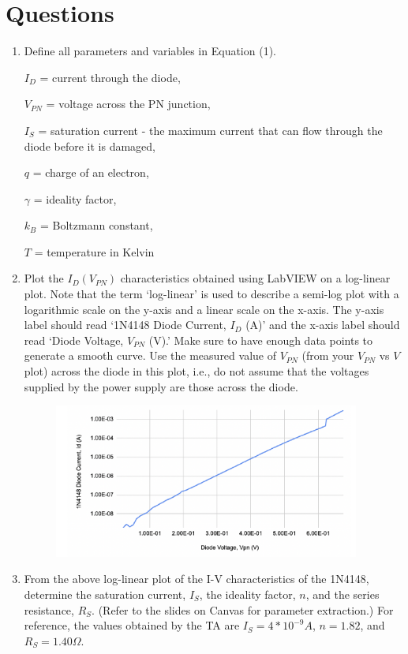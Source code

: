\documentclass[12pt]{article}
\begin{document}
\section{Questions}
\begin{enumerate}
\item Define all parameters and variables in Equation (1).

$I_D$ = current through the diode,

$V_{PN}$ = voltage across the PN junction,

$I_S$ = saturation current - the maximum current that can flow through the diode before it is damaged,

$q$ = charge of an electron,

$\gamma$ = ideality factor,

$k_B$ = Boltzmann constant,

$T$ = temperature in Kelvin

\item Plot the $I_D(V_{PN})$ characteristics obtained using
LabVIEW on a log-linear plot. Note that the term `log-linear' is
used to describe a semi-log plot with a logarithmic scale on the
y-axis and a linear scale on the x-axis. The y-axis label should
read `1N4148 Diode Current, $I_D$ (A)' and the x-axis label
should read `Diode Voltage, $V_{PN}$ (V).' Make sure to have
enough data points to generate a smooth curve. Use the measured
value of $V_{PN}$ (from your $V_{PN}$ vs $V$ plot) across the
diode in this plot, i.e., do not assume that the voltages
supplied by the power supply are those across the diode.


\begin{figure}[h]
    \centering
    \includegraphics[width=0.95\textwidth]{q1_plot.png}
    \caption{}
    \label{fig:colored-leds-22}
\end{figure}


\item From the above log-linear plot of the I-V characteristics
of the 1N4148, determine the saturation current, $I_S$, the
ideality factor, $n$, and the series resistance, $R_S$. (Refer to
the slides on Canvas for parameter extraction.) For reference,
the values obtained by the TA are $I_{S} = 4*10^{-9}A$, $n =
1.82$, and $R_{S} = 1.40 \Omega$.


\end{enumerate}
\end{document}
